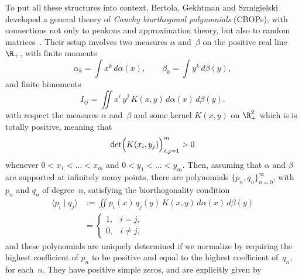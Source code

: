 \documentclass[10pt,a4paper]{article} \pdfoutput=1 
\begin{document}
\begin{remark}
  \label{rem:DP-CBOP}
  To put all these structures into context,
  Bertola, Gekhtman and Szmigielski
  \cite{bertola-gekhtman-szmigielski:2009:cubicstring,
    bertola-gekhtman-szmigielski:2010:cauchy}
  developed a general theory of \emph{Cauchy biorthogonal polynomials} (CBOPs),
  with connections not only to peakons and approximation theory,
  but also to random matrices~\cite{bertola-gekhtman-szmigielski:2009:twomatrix,
    bertola-gekhtman-szmigielski:2013:strong-asymptotics,
    bertola-gekhtman-szmigielski:2014:cauchy-laguerre-twomatrix-meijerG}.
  Their setup involves two measures $\alpha$ and~$\beta$ on the positive real line~$\R_+$,
  with finite moments
  \begin{equation}
    \alpha_k = \int x^k \, d\alpha(x)
    ,\qquad
    \beta_k = \int y^k \, d\beta(y)
    ,
  \end{equation}
  and finite bimoments
  \begin{equation}
    I_{ij} = \iint x^i \, y^j \, K(x,y) \, d\alpha(x) \, d\beta(y)
    .
  \end{equation}
  with respect the measures $\alpha$ and~$\beta$ and some kernel $K(x,y)$ on $\R_+^2$
  which is is totally positive, meaning that
  \begin{equation*}
    \det \Bigl( K(x_i,y_j) \Bigr)_{i,j=1}^m > 0
  \end{equation*}
  whenever $0 < x_1 < \dots < x_m$ and $0 < y_1 < \dots < y_m$.
  Then, assuming that $\alpha$ and $\beta$ are supported at infinitely many points,
  there are polynomials $\{ p_n , q_n \}_{n=0}^{\infty}$,
  with $p_n$ and $q_n$ of degree~$n$,
  satisfying the biorthogonality condition
  \begin{equation}
    \begin{split}
      \langle p_i \mid q_j \rangle
      &:=
      \iint p_i(x) \, q_j(y) \, K(x,y) \, d\alpha(x) \, d\beta(y)
      \\ &
      =
      \begin{cases}
        1, & i=j
        ,\\
        0, & i \neq j
        ,
      \end{cases}
    \end{split}
  \end{equation}
  and these polynomials are uniquely determined if we normalize by requiring
  the highest coefficient of $p_n$ to be positive and equal to
  the highest coefficient of~$q_n$, for each~$n$.
  They have positive simple zeros, and are explicitly given by

\end{remark}
\end{document}
